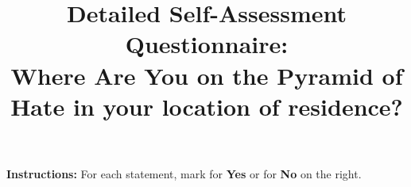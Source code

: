 \documentclass[a4paper,11pt]{article}
\title{Detailed Self-Assessment Questionnaire:\\ Where Are You on the Pyramid of Hate in your location of residence?}
\date{}
\begin{document}
	
	\maketitle
	
	\noindent\textbf{Instructions:} For each statement, mark \fbox{\rule{0pt}{1.5ex}\hspace{1.5em}} for \textbf{Yes} or \fbox{\rule{0pt}{1.5ex}\hspace{1.5em}} for \textbf{No} on the right.
	
	\vspace{1em}
	
	\renewcommand{\arraystretch}{0.75}
	
	\newcommand{\question}[1]{%
		\stepcounter{qnum}\theqnum. #1
	}
	
\end{document}

